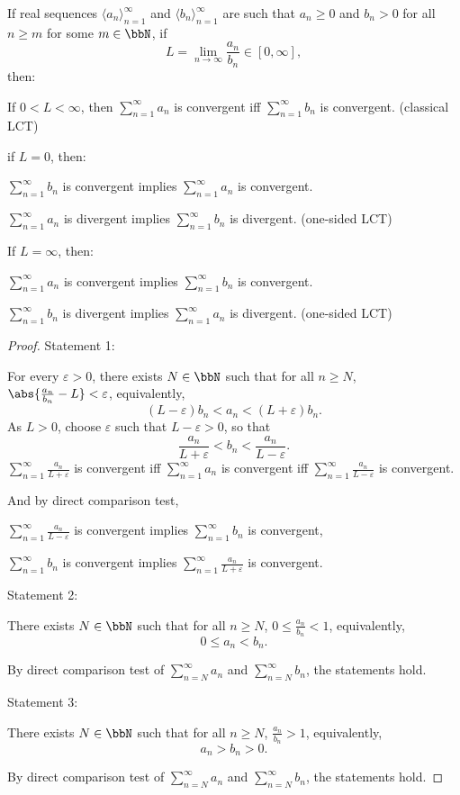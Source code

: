 If real sequences $\langle a_n\rangle_{n=1}^{\infty}$ and $\langle b_n\rangle_{n=1}^{\infty}$ are such that $a_n\geq 0$ and $b_n>0$ for all $n\geq m$ for some $m\in\bbN$, if
\[L=\lim_{n\to\infty}\frac{a_n}{b_n}\in[0,\infty],\]
then:
\ben
\item If $0<L<\infty$, then $\sum_{n=1}^{\infty}a_n$ is convergent iff $\sum_{n=1}^{\infty}b_n$ is convergent. (classical LCT)
\item if $L=0$, then:
\ben
\item $\sum_{n=1}^{\infty}b_n$ is convergent implies $\sum_{n=1}^{\infty}a_n$ is convergent.
\item $\sum_{n=1}^{\infty}a_n$ is divergent implies $\sum_{n=1}^{\infty}b_n$ is divergent.
\een
(one-sided LCT)
\item If $L=\infty$, then:
\ben
\item $\sum_{n=1}^{\infty}a_n$ is convergent implies $\sum_{n=1}^{\infty}b_n$ is convergent.
\item $\sum_{n=1}^{\infty}b_n$ is divergent implies $\sum_{n=1}^{\infty}a_n$ is divergent.
\een
(one-sided LCT)
\een
\begin{proof}
Statement 1:

For every $\varepsilon>0$, there exists $N\in\bbN$ such that for all $n\geq N$, $\abs{\frac{a_n}{b_n}-L}<\varepsilon$, equivalently,
\[(L-\varepsilon)b_n<a_n<(L+\varepsilon)b_n.\]
As $L>0$, choose $\varepsilon$ such that $L-\varepsilon>0$, so that
\[\frac{a_n}{L+\varepsilon}<b_n<\frac{a_n}{L-\varepsilon}.\]
$\sum_{n=1}^{\infty}\frac{a_n}{L+\varepsilon}$ is convergent iff $\sum_{n=1}^{\infty}a_n$ is convergent iff $\sum_{n=1}^{\infty}\frac{a_n}{L-\varepsilon}$ is convergent.

And by direct comparison test,
\bit
\item $\sum_{n=1}^{\infty}\frac{a_n}{L-\varepsilon}$ is convergent implies $\sum_{n=1}^{\infty}b_n$ is convergent,
\item $\sum_{n=1}^{\infty}b_n$ is convergent implies $\sum_{n=1}^{\infty}\frac{a_n}{L+\varepsilon}$ is convergent.
\eit

Statement 2:

There exists $N\in\bbN$ such that for all $n\geq N$, $0\leq\frac{a_n}{b_n}<1$, equivalently,
\[0\leq a_n<b_n.\]

By direct comparison test of $\sum_{n=N}^{\infty}a_n$ and $\sum_{n=N}^{\infty}b_n$, the statements hold.

Statement 3:

There exists $N\in\bbN$ such that for all $n\geq N$, $\frac{a_n}{b_n}>1$, equivalently,
\[a_n>b_n>0.\]

By direct comparison test of $\sum_{n=N}^{\infty}a_n$ and $\sum_{n=N}^{\infty}b_n$, the statements hold.
\end{proof}
